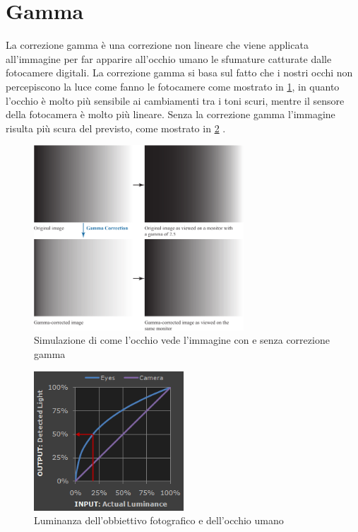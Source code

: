 \section{Gamma}\label{gamma}

La correzione gamma è una correzione non lineare che viene applicata all'immagine per far apparire all'occhio umano le sfumature catturate dalle fotocamere digitali. La correzione gamma si basa sul fatto che i nostri occhi non percepiscono la luce come fanno le fotocamere come mostrato in \cref{fig:gamma-correction}, in quanto l'occhio è molto più sensibile ai cambiamenti tra i toni scuri, mentre il sensore della fotocamera è molto più lineare. Senza la correzione gamma l'immagine risulta più scura del previsto, come mostrato in \cref{fig:gamma} \cite{gamma} \cite{gonzalez_dip}. 

\begin{figure}[ht]
    \centering
    \includegraphics[width=0.7\textwidth]{preprocessing/gamma-correction.pdf}
    \caption{Simulazione di come l'occhio vede l'immagine con e senza correzione gamma}
    \label{fig:gamma-correction}
\end{figure}


\begin{figure}[ht]
    \centering
    \includegraphics[width=0.5\textwidth]{preprocessing/gamma.png}
    \caption{Luminanza dell'obbiettivo fotografico e dell'occhio umano}
    \label{fig:gamma}
\end{figure}

